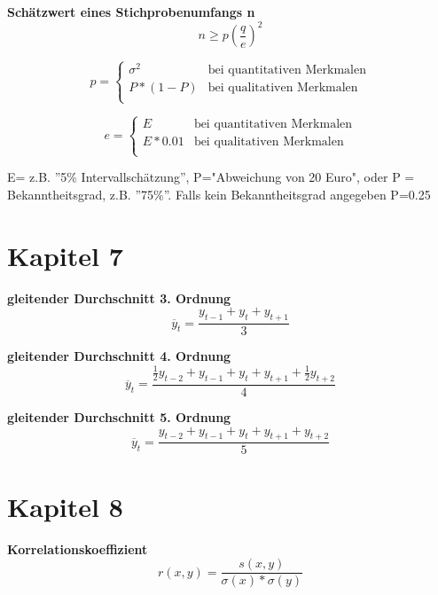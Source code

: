\documentclass[11pt,twocolumn,fleqn]{article}
\begin{document}
\textbf{Schätzwert eines Stichprobenumfangs n}
\begin{equation*}
n \geq p (\frac{q}{e})^2
\end{equation*}

\begin{equation*}
p = \begin{cases} 
\sigma^2 & \text{bei quantitativen Merkmalen} \\ 
P*(1-P) & \text{bei qualitativen Merkmalen}  \\ 
\end{cases}
\end{equation*}

\begin{equation*}
e = \begin{cases} 
E & \text{bei quantitativen Merkmalen} \\ 
E*0.01 & \text{bei qualitativen Merkmalen}  \\ 
\end{cases}
\end{equation*}

E= z.B. ''5\% Intervallschätzung'', P="Abweichung von 20 Euro", oder P = Bekanntheitsgrad, z.B. ''75\%''. Falls kein Bekanntheitsgrad angegeben P=0.25  

\section{Kapitel 7}
\textbf{gleitender Durchschnitt 3. Ordnung}
\begin{equation*}
\overline{y}_t = \frac{y_{t-1} + y_t + y_{t+1}}{3}
\end{equation*}

\textbf{gleitender Durchschnitt 4. Ordnung}
\begin{equation*}
\overline{y}_t = \frac{ \frac{1}{2}y_{t-2} + y_{t-1} + y_t + y_{t+1} + \frac{1}{2}y_{t+2}}{4}
\end{equation*}

\textbf{gleitender Durchschnitt 5. Ordnung}
\begin{equation*}
\overline{y}_t = \frac{ y_{t-2} + y_{t-1} + y_t + y_{t+1} + y_{t+2}}{5}
\end{equation*}

\section{Kapitel 8}
\textbf{Korrelationskoeffizient}
\begin{equation*}
r(x,y)= \frac{s(x,y)}{\sigma(x)*\sigma(y)}
\end{equation*}
\end{document}
